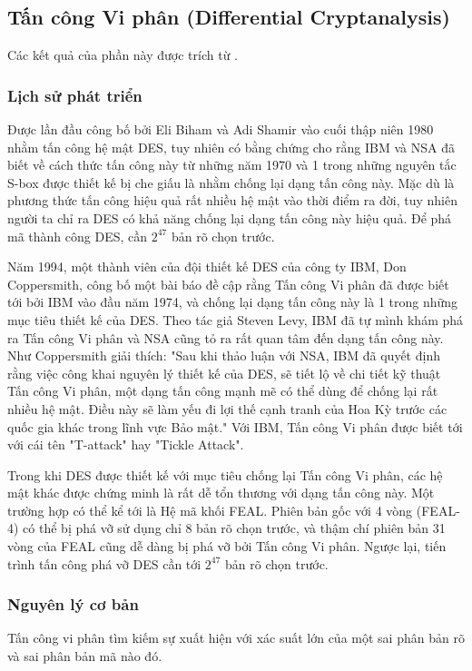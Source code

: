 \newpage
\subsection{Tấn công Vi phân (Differential Cryptanalysis)}
Các kết quả của phần này được trích từ \cite{hey2002}.
\subsubsection{Lịch sử phát triển}
Được lần đầu công bố bởi Eli Biham và Adi Shamir vào cuối thập niên 1980 nhằm tấn công hệ mật DES, tuy nhiên có bằng chứng cho rằng IBM và NSA đã biết về cách thức tấn công này từ những năm 1970 và 1 trong những nguyên tắc S-box được thiết kế bị che giấu là nhằm chống lại dạng tấn công này.
Mặc dù là phương thức tấn công hiệu quả rất nhiều hệ mật vào thời điểm ra đời, tuy nhiên người ta chỉ ra DES có khả năng chống lại dạng tấn công này hiệu quả. Để phá mã thành công DES, cần $2^{47}$ bản rõ chọn trước.

Năm 1994, một thành viên của đội thiết kế DES của công ty IBM, Don Coppersmith, công bố một bài báo đề cập rằng Tấn công Vi phân đã được biết tới bởi IBM vào đầu năm 1974, và chống lại dạng tấn công này là 1 trong những mục tiêu thiết kế của DES. Theo tác giả Steven Levy, IBM đã tự mình khám phá ra Tấn công Vi phân và NSA cũng tỏ ra rất quan tâm đến dạng tấn công này. Như Coppersmith giải thích: "Sau khi thảo luận với NSA, IBM đã quyết định rằng việc công khai nguyên lý thiết kế của DES, sẽ tiết lộ về chi tiết kỹ thuật Tấn công Vi phân, một dạng tấn công mạnh mẽ có thể dùng để chống lại rất nhiều hệ mật. Điều này sẽ làm yếu đi lợi thế cạnh tranh của Hoa Kỳ trước các quốc gia khác trong lĩnh vực Bảo mật." Với IBM, Tấn công Vi phân được biết tới với cái tên "T-attack" hay "Tickle Attack".

Trong khi DES được thiết kế với mục tiêu chống lại Tấn công Vi phân, các hệ mật khác được chứng minh là rất dễ tổn thương với dạng tấn công này. Một trường hợp có thể kể tới là Hệ mã khối FEAL. Phiên bản gốc với 4 vòng (FEAL-4) có thể bị phá vỡ sử dụng chỉ 8 bản rõ chọn trước, và thậm chí phiên bản 31 vòng của FEAL cũng dễ dàng bị phá vỡ bởi Tấn công Vi phân. Ngược lại, tiến trình tấn công phá vỡ DES cần tới $2^{47}$ bản rõ chọn trước.
\subsubsection{Nguyên lý cơ bản}
Tấn công vi phân tìm kiếm sự xuất hiện với xác suất lớn của một sai phân bản rõ và sai phân bản mã nào đó.

